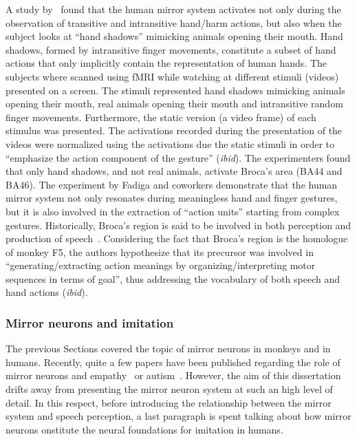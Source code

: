 A study by~\citep{fadiga.etal:2006} found that the human mirror system 
activates not only during the observation of transitive and intransitive
hand/harm actions, but also when the subject looks at ``hand shadows'' mimicking
animals opening their mouth. 
Hand shadows, formed by intransitive finger movements, constitute a subset of
hand actions that only implicitly contain the representation of human hands.
The subjects where scanned using fMRI while watching at different stimuli
(videos) presented on a screen. 
The stimuli represented hand shadows mimicking animals opening
their mouth, real animals opening their mouth and intransitive random finger 
movements.
Furthermore, the static version (a video frame) of each stimulus was presented.
The activations recorded during the presentation of the videos were normalized
using the activations due the static stimuli in order to ``emphasize the action 
component of the gesture'' (\emph{ibid}).
The experimenters found that only hand shadows, and not real animals, activate 
Broca's area (BA44 and BA46).
The experiment by Fadiga and coworkers demonstrate that the human mirror system
not only resonates during meaningless hand and finger gestures, but it is also 
involved in the extraction of ``action units'' starting from complex
gestures.
Historically, Broca's region is said to be involved in both perception and 
production of speech~\citep{kandel.schwartz.jessel:2000}.
Considering the fact that Broca's region is the homologue of monkey F5, the
authors hypothesize that its precursor was involved in ``generating/extracting
action meanings by organizing/interpreting motor sequences in terms of goal'',
thus addressing the vocabulary of both speech and hand actions (\emph{ibid}).
\subsubsection{Mirror neurons and imitation}
\label{sec:actions:imitation}
The previous Sections covered the topic of mirror neurons in monkeys and in 
humans.
Recently, quite a few papers have been published regarding the role of mirror
neurons and empathy~\citep{wicker.etal:2003} or
autism~\citep{oberman.etal:2005}.
However, the aim of this dissertation drifts away from presenting the mirror 
neuron system at such an high level of detail.
In this respect, before introducing the relationship between the mirror system
and speech perception, a last paragraph is spent talking about how mirror
neurons onstitute the neural foundations for imitation in humans.

